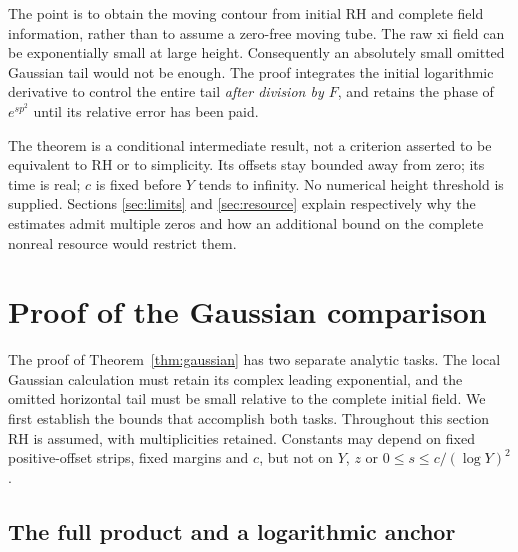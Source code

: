 \documentclass[11pt]{article}
\theoremstyle{remark}
\begin{document}
The point is to obtain the moving contour from initial RH and complete
field information, rather than to assume a zero-free moving tube.
The raw xi field can be exponentially small at large height.
Consequently an absolutely small omitted Gaussian tail would not be
enough. The proof integrates the initial logarithmic derivative to
control the entire tail \emph{after division by $F$}, and retains the
phase of $e^{sp^2}$ until its relative error has been paid.

The theorem is a conditional intermediate result, not a criterion
asserted to be equivalent to RH or to simplicity. Its offsets stay
bounded away from zero; its time is real; $c$ is fixed before $Y$ tends
to infinity. No numerical height threshold is supplied. Sections
\ref{sec:limits} and \ref{sec:resource} explain respectively why the
estimates admit multiple zeros and how an additional bound on the
complete nonreal resource would restrict them.

\section{Proof of the Gaussian comparison}
\label{scf-proof}

The proof of Theorem~\ref{thm:gaussian} has two separate analytic tasks.
The local Gaussian calculation must retain its complex leading exponential,
and the omitted horizontal tail must be small relative to the complete
initial field.  We first establish the bounds that accomplish both tasks.
Throughout this section RH is assumed, with multiplicities retained.
Constants may depend on fixed positive-offset strips, fixed margins and
$c$, but not on $Y$, $z$ or $0\le s\le c/(\log Y)^2$.

\subsection{The full product and a logarithmic anchor}
\end{document}
